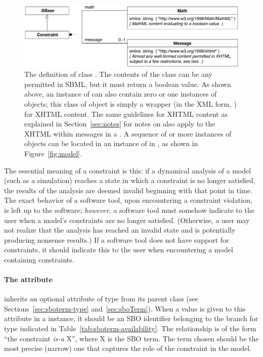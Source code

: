 \begin{figure}[htb]
  \centering
  \small
  \vspace*{2ex}
  \includegraphics[scale=0.8]{figs/constraint-uml}
  \caption{The definition of class \Constraint.  The contents of
    the \Math class can be any \mathml permitted in SBML,
    but it must return a boolean value.  As shown above, an
    instance of \Constraint can also contain zero or one instances
    of \Message objects; this class of object is simply a wrapper
    (in the XML form, ) for
    XHTML content.  The same guidelines for XHTML content as
    explained in Section~\ref{sec:notes} for notes on \SBaseUpright also
    apply to the XHTML within messages in a \Constraint. A
    sequence of  or more instances of \Constraint objects can
    be located in an instance of \ListOfConstraints in \Model, as
    shown in Figure~\protect\ref{fig:model}.}
  \label{fig:constraint}
\end{figure}

The essential meaning of a constraint is this: if a dynamical
analysis of a model (such as a simulation) reaches a state in
which a constraint is no longer satisfied, the results of the
analysis are deemed invalid beginning with that point in time.
The exact behavior of a software tool, upon encountering a
constraint violation, is left up to the software; \emph{however},
a software tool must somehow indicate to the user when a model's
constraints are no longer satisfied.  (Otherwise, a user may not
realize that the analysis has reached an invalid state and is
potentially producing nonsense results.)  If a software tool does
not have support for constraints, it should indicate this to the
user when encountering a model containing constraints.


\paragraph{The  attribute}
\label{sec:constraint-sboterm}

\Constraint inherits an optional 
attribute of type  from its parent
class \SBase (see Sections~\ref{sec:sboterm-type}
and~\ref{sec:sboTerm}).  When a value is given to this
attribute in a  \Constraint instance, it should be an
SBO identifier belonging to the branch for type  \Constraint
indicated in Table~\ref{tab:sboterm-availability}.  The relationship is
of the form ``the constraint \emph{is-a} X'', where X is
the SBO term.  The term chosen should be the most precise (narrow)
one that captures the role of the constraint in the model.

